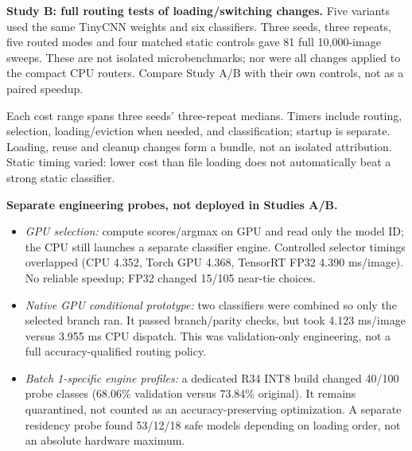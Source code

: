 \documentclass[10pt,a4paper]{article}
\newcommand{\smallcap}[1]{{\footnotesize\color{navy}#1}\par}
\begin{document}


\textbf{Study B: full routing tests of loading/switching changes.} Five variants used the same TinyCNN weights and six classifiers. Three seeds, three repeats, five routed modes and four matched static controls gave 81 full 10,000-image sweeps. These are not isolated microbenchmarks; nor were all changes applied to the compact CPU routers. Compare Study A/B with their own controls, not as a paired speedup.



\smallcap{Each cost range spans three seeds' three-repeat medians. Timers include routing, selection, loading/eviction when needed, and classification; startup is separate. Loading, reuse and cleanup changes form a bundle, not an isolated attribution. Static timing varied: lower cost than file loading does not automatically beat a strong static classifier.}

\textbf{Separate engineering probes, not deployed in Studies A/B.}
\begin{itemize}
\item \emph{GPU selection:} compute scores/argmax on GPU and read only the model ID; the CPU still launches a separate classifier engine. Controlled selector timings overlapped (CPU 4.352, Torch GPU 4.368, TensorRT FP32 4.390 ms/image). No reliable speedup; FP32 changed 15/105 near-tie choices.
\item \emph{Native GPU conditional prototype:} two classifiers were combined so only the selected branch ran. It passed branch/parity checks, but took 4.123 ms/image versus 3.955 ms CPU dispatch. This was validation-only engineering, not a full accuracy-qualified routing policy.
\item \emph{Batch 1-specific engine profiles:} a dedicated R34 INT8 build changed 40/100 probe classes (68.06\% validation versus 73.84\% original). It remains quarantined, not counted as an accuracy-preserving optimization. A separate residency probe found 53/12/18 safe models depending on loading order, not an absolute hardware maximum.
\end{itemize}
\end{document}
